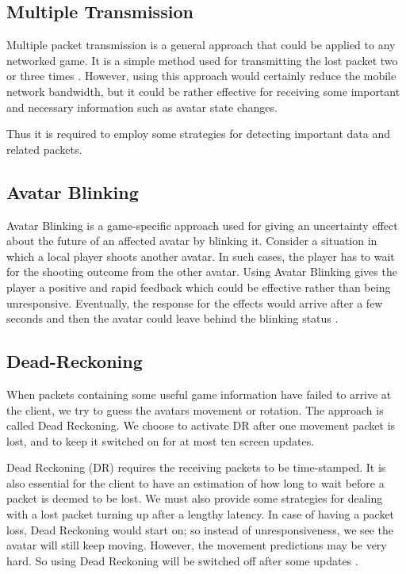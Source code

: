 \documentclass[conference]{IEEEtran}
\begin{document}
\subsection{Multiple Transmission}
Multiple packet  transmission  is  a  general  approach that could be applied to any networked game. It is a simple method used for transmitting the lost packet two or three times \cite{r24}. However, using this approach would certainly reduce the  mobile network bandwidth, but it could be rather effective for receiving some important and necessary information such as avatar state changes.

Thus it is required to employ some strategies for detecting important data and related packets.

\subsection{Avatar Blinking}
Avatar Blinking is a game-specific approach used for giving an uncertainty effect about the future of an affected avatar by blinking it. Consider a situation in which a local player shoots another avatar. In such cases, the player has to wait for the shooting outcome from the other avatar. Using Avatar Blinking gives the player a positive and rapid feedback which could be effective rather than being unresponsive. Eventually, the response for the effects would arrive after a few seconds and then the avatar could leave behind the blinking status \cite{r25}.

\subsection{Dead-Reckoning}
When packets containing some useful game information have failed to arrive at the client, we try to guess the avatars movement or rotation. The approach is called Dead Reckoning. We choose to activate DR after one movement packet is lost, and to keep it switched on for at most ten screen updates.

Dead Reckoning (DR) requires the receiving packets to be time-stamped. It is also essential for the client to have an estimation of how long to wait before a packet is deemed to be lost. We must also provide some strategies for dealing with a lost packet turning up after a lengthy latency. In case of having a packet loss, Dead Reckoning would start on; so instead of unresponsiveness, we see the avatar will still keep moving. However, the movement predictions may be very hard. So using Dead Reckoning will be switched off after some updates \cite{r26, r27}.
\end{document}

